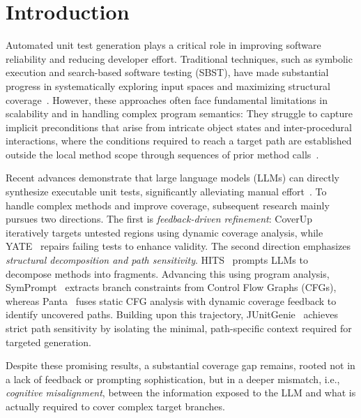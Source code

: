 \section{Introduction}

Automated unit test generation plays a critical role in improving software reliability and reducing developer effort. Traditional techniques, such as symbolic execution and search-based software testing (SBST), have made substantial progress in systematically exploring input spaces and maximizing structural coverage~\cite{cadar2008klee, evosuite, mcminn2011, randoop}. However, these approaches often face fundamental limitations in scalability and in handling complex program semantics: They struggle to capture implicit preconditions that arise from intricate object states and inter-procedural interactions, where the conditions required to reach a target path are established outside the local method scope through sequences of prior method calls~\cite{baldoni2018}.

Recent advances demonstrate that large language models (LLMs) can directly synthesize executable unit tests, significantly alleviating manual effort~\cite{yuan2024manualtest, chen2024, chu2025}. To handle complex methods and improve coverage, subsequent research mainly pursues two directions. The first is \textit{feedback-driven refinement}: CoverUp~\cite{chen2024} iteratively targets untested regions using dynamic coverage analysis, while YATE~\cite{konstantinou2025yate} repairs failing tests to enhance validity. The second direction emphasizes \textit{structural decomposition and path sensitivity}. %
HITS~\cite{wang2024c} prompts LLMs to decompose methods into fragments. Advancing this using program analysis, SymPrompt~\cite{ryan2024} extracts branch constraints from Control Flow Graphs (CFGs), whereas Panta~\cite{gu2025a} fuses static CFG analysis with dynamic coverage feedback to identify uncovered paths. Building upon this trajectory, JUnitGenie~\cite{liao2025} achieves strict path sensitivity by isolating the minimal, path-specific context required for targeted generation.

Despite these promising results, a substantial coverage gap remains, rooted not in a lack of feedback or prompting sophistication, but in a deeper mismatch, i.e., \emph{cognitive misalignment}, between the information exposed to the LLM and what is actually required to cover complex target branches.

